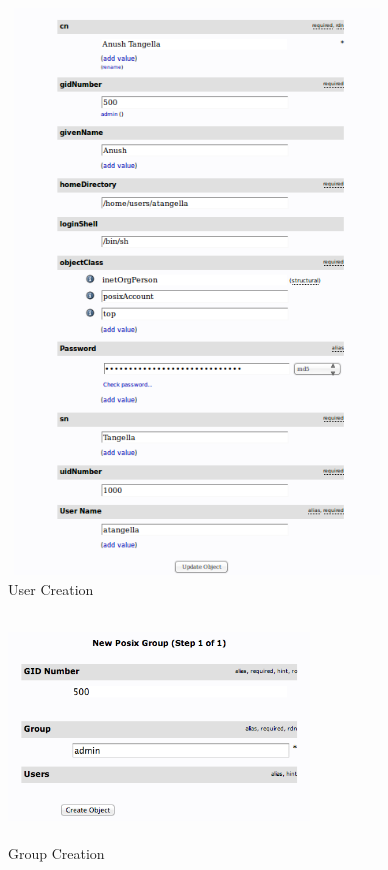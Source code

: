 \documentclass[12pt]{report}
\begin{document}
		
		\begin{figure}[H]
		\begin{center}
		\includegraphics[width=10cm,height=15cm]{Screens/UserCreation.png}
		\caption{User Creation \label{fig: User Creation}}
		\end{center}
		\end{figure}

		\begin{figure}[H]
		\begin{center}
		\includegraphics[width=8cm,height=6cm]{Screens/admin_group.png}
		\caption{Group Creation \label{fig: Group Creation}}
		\end{center}
		\end{figure}		
		
\end{document}
